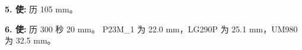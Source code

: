 \documentclass[11pt,a4paper]{article}
\numberwithin{equation}{section}
\numberwithin{figure}{section}
\begin{document}
\textbf{5. {\cjkfont 使}\allowbreak{}:} {\cjkfont 历}\allowbreak{} 105 mm{\cjkfont 。}\allowbreak{}

\textbf{6. {\cjkfont 使}\allowbreak{}:} {\cjkfont 历}\allowbreak{} 300 {\cjkfont 秒}\allowbreak{} 20 mm{\cjkfont 。}\allowbreak{} P23M\_1 {\cjkfont 为}\allowbreak{} 22.0 mm{\cjkfont ，}\allowbreak{}LG290P {\cjkfont 为}\allowbreak{} 25.1 mm{\cjkfont ，}\allowbreak{}UM980 {\cjkfont 为}\allowbreak{} 32.5 mm{\cjkfont 。}\allowbreak{}
\end{document}
